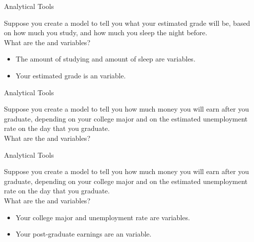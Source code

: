 \documentclass{beamer}
\begin{document}
\begin{frame}{Analytical Tools}
  \bigskip
  
  Suppose you create a model to tell you what your estimated grade will be, based on how much you study, and how much you sleep the night before. 
\\
  What are the  and  variables?
  \begin{itemize}
    \item The amount of studying and amount of sleep are  variables.
    \item Your estimated grade is an  variable.
  \end{itemize}
\end{frame}
\begin{frame}{Analytical Tools}
  \bigskip
  
  Suppose you create a model to tell you how much money you will earn after you graduate, depending on your college major and on the estimated unemployment rate on the day that you graduate. 
\\
  What are the  and  variables?
\end{frame}
\begin{frame}{Analytical Tools}
  \bigskip
  
  Suppose you create a model to tell you how much money you will earn after you graduate, depending on your college major and on the estimated unemployment rate on the day that you graduate. 
\\
  What are the  and  variables?
  \begin{itemize}
    \item Your college major and unemployment rate are  variables.
    \item Your post-graduate earnings are an  variable.
  \end{itemize}
\end{frame}
\end{document}
